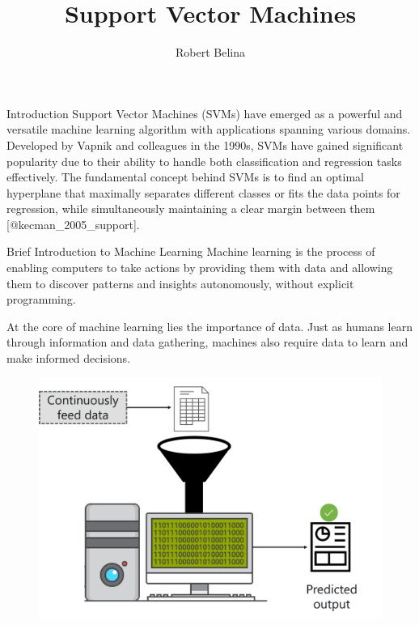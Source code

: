 \documentclass[
  ignorenonframetext,
]{beamer}
\title{Support Vector Machines}
\author{Robert Belina}
\date{}
\begin{document}
\frame{\titlepage}
\ifdefined\Shaded\renewenvironment{Shaded}{\begin{tcolorbox}[breakable, borderline west={3pt}{0pt}{shadecolor}, enhanced, boxrule=0pt, interior hidden, frame hidden, sharp corners]}{\end{tcolorbox}}\fi

\begin{frame}{Introduction}
\protect\hypertarget{introduction}{}
Support Vector Machines (SVMs) have emerged as a powerful and versatile
machine learning algorithm with applications spanning various domains.
Developed by Vapnik and colleagues in the 1990s, SVMs have gained
significant popularity due to their ability to handle both
classification and regression tasks effectively. The fundamental concept
behind SVMs is to find an optimal hyperplane that maximally separates
different classes or fits the data points for regression, while
simultaneously maintaining a clear margin between them
{[}@kecman\_2005\_support{]}.

\begin{block}{Brief Introduction to Machine Learning}
\protect\hypertarget{brief-introduction-to-machine-learning}{}
Machine learning is the process of enabling computers to take actions by
providing them with data and allowing them to discover patterns and
insights autonomously, without explicit programming.

At the core of machine learning lies the importance of data. Just as
humans learn through information and data gathering, machines also
require data to learn and make informed decisions.

\begin{figure}

{\centering \includegraphics{ml1.png}

}
\end{figure}
\end{block}
\end{frame}
\end{document}
